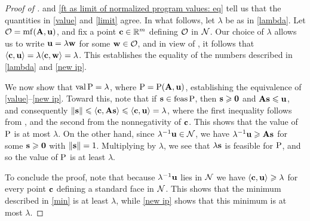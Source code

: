 \documentclass{amsart}
\begin{document}
\begin{proof}[Proof of ]
    and \eqref{ft as limit of normalized program values: eq} tell us that the quantities in \ref{value} and \ref{limit} agree.  In what follows, let $\lambda$ be as in \ref{lambda}.
   Let $\mathcal{O} = \operatorname{mf}(\mathbf{A},\mathbf{u})$, and fix a point $\mathbf{c} \in \mathbb{R}^m$ defining $\mathcal{O}$ in $\mathcal{N}$.
   Our choice of $\lambda$ allows us to write $\mathbf{u} = \lambda \mathbf{w}$ for some $\mathbf{w} \in \mathcal{O}$, and in view of , it follows that $\langle \mathbf{c}, \mathbf{u} \rangle = \lambda \langle \mathbf{c}, \mathbf{w} \rangle = \lambda$.
   This establishes the equality of the numbers described in \ref{lambda} and \ref{new ip}.

   We now show that $\operatorname{val} \mathrm{P} = \lambda$, where $\mathrm{P} = \mathrm{P}(\mathbf{A}, \mathbf{u})$, establishing the equivalence of \ref{value}--\ref{new ip}.
   Toward this, note that if $\mathbf{s} \in \operatorname{feas} \mathrm{P}$, then $\mathbf{s}\geqslant \mathbf{0}$ and $\mathbf{A} \mathbf{s} \leqslant \mathbf{u}$, and consequently $\| \mathbf{s} \| \leqslant \langle \mathbf{c}, \mathbf{A} \mathbf{s} \rangle \leqslant \langle \mathbf{c}, \mathbf{u} \rangle = \lambda$, where the first inequality follows from , and the second from the nonnegativity of $\mathbf{c}$.
   This shows that the value of $\mathrm{P}$ is at most $\lambda$.
   On the other hand, since $\lambda^{-1}\mathbf{u} \in \mathcal{N}$, we have $\lambda^{-1}\mathbf{u} \geqslant \mathbf{A}\mathbf{s}$ for some $\mathbf{s} \geqslant \mathbf{0}$ with $\| \mathbf{s} \| = 1$.
   Multiplying by $\lambda$, we see that  $\lambda\mathbf{s}$ is feasible for $\mathrm{P}$, and so the value of $\mathrm{P}$ is at least $\lambda$.

   To conclude the proof, note that because $\lambda^{-1}\mathbf{u}$ lies in $\mathcal{N}$ we have $\langle \mathbf{c}, \mathbf{u} \rangle \geqslant \lambda$ for every point $\mathbf{c}$ defining a standard face in $\mathcal{N}$.
   This shows that the minimum described in \ref{min} is at least $\lambda$, while \ref{new ip} shows that this minimum is at most $\lambda$.
\end{proof}
\end{document}
